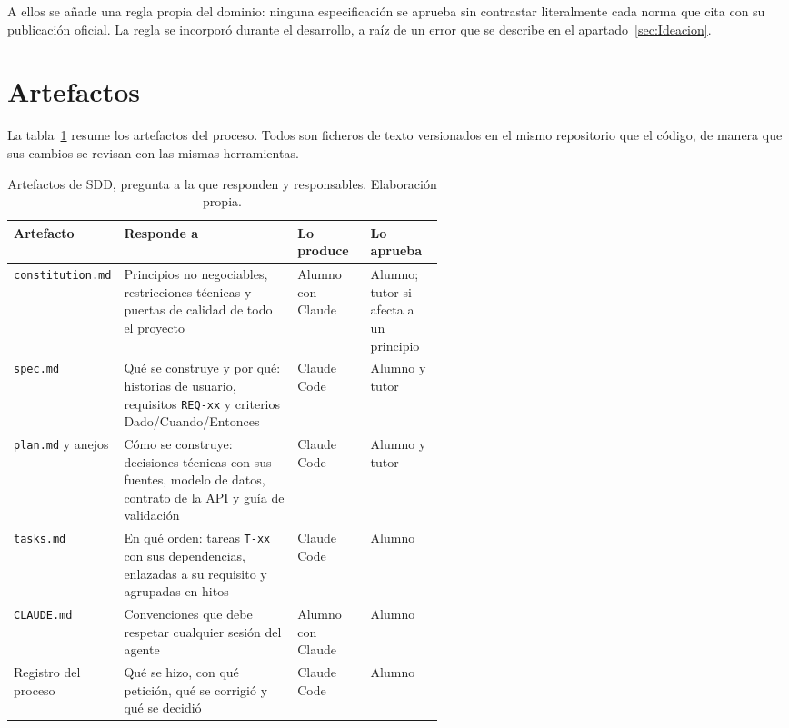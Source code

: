 A ellos se añade una regla propia del dominio: ninguna especificación se aprueba sin contrastar literalmente cada norma que cita con su publicación oficial. La regla se incorporó durante el desarrollo, a raíz de un error que se describe en el apartado~\ref{sec:Ideacion}.

\section{Artefactos}\label{sec:Artefactos}

La tabla~\ref{tab:Artefactos} resume los artefactos del proceso. Todos son ficheros de texto versionados en el mismo repositorio que el código, de manera que sus cambios se revisan con las mismas herramientas.

\begin{table}[htbp]
	\centering
	\small
	\caption{Artefactos de SDD, pregunta a la que responden y responsables. Elaboración propia.}
	\label{tab:Artefactos}
	\begin{tabularx}{\linewidth}{@{}>{\raggedright\arraybackslash}p{0.21\linewidth}>{\raggedright\arraybackslash}X>{\raggedright\arraybackslash}p{0.17\linewidth}>{\raggedright\arraybackslash}p{0.17\linewidth}@{}}
		\toprule
		\textbf{Artefacto} & \textbf{Responde a} & \textbf{Lo produce} & \textbf{Lo aprueba} \\
		\midrule
		\texttt{constitution.md} & Principios no negociables, restricciones técnicas y puertas de calidad de todo el proyecto & Alumno con Claude & Alumno; tutor si afecta a un principio \\
		\texttt{spec.md} & Qué se construye y por qué: historias de usuario, requisitos \texttt{REQ-xx} y criterios Dado/Cuando/Entonces & Claude Code & Alumno y tutor \\
		\texttt{plan.md} y anejos & Cómo se construye: decisiones técnicas con sus fuentes, modelo de datos, contrato de la API y guía de validación & Claude Code & Alumno y tutor \\
		\texttt{tasks.md} & En qué orden: tareas \texttt{T-xx} con sus dependencias, enlazadas a su requisito y agrupadas en hitos & Claude Code & Alumno \\
		\texttt{CLAUDE.md} & Convenciones que debe respetar cualquier sesión del agente & Alumno con Claude & Alumno \\
		Registro del proceso & Qué se hizo, con qué petición, qué se corrigió y qué se decidió & Claude Code & Alumno \\
		\bottomrule
	\end{tabularx}
\end{table}

